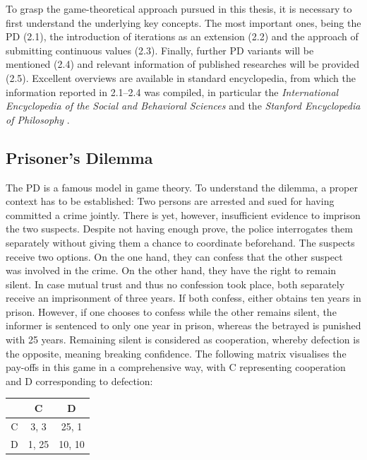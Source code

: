 \documentclass[11pt]{article}
\begin{document}
To grasp the game-theoretical approach pursued in this thesis, it is necessary to first understand the underlying key concepts. 
The most important ones, being the PD (2.1), the introduction of iterations as an extension (2.2) and the approach of submitting continuous values (2.3).
Finally, further PD variants will be mentioned (2.4) and relevant information of published researches will be provided (2.5).
Excellent overviews are available in standard encyclopedia, from which the information reported in 2.1–2.4 was compiled, in particular the \textit{International Encyclopedia of the Social and Behavioral Sciences} \cite{RC15} and the \textit{Stanford Encyclopedia of Philosophy} \cite{Kuh25}.

\subsection{Prisoner's Dilemma}
		
The PD is a famous model in game theory. 
To understand the dilemma, a proper context has to be established:
Two persons are arrested and sued for having committed a crime jointly.
There is yet, however, insufficient evidence to imprison the two suspects.
Despite not having enough prove, the police interrogates them separately without giving them a chance to coordinate beforehand.
The suspects receive two options.
On the one hand, they can confess that the other suspect was involved in the crime. 
On the other hand, they have the right to remain silent.
In case mutual trust and thus no confession took place, both separately receive an imprisonment of three years.
If both confess, either obtains ten years in prison.
However, if one chooses to confess while the other remains silent, the informer is sentenced to only one year in prison, whereas the betrayed is punished with 25 years.
Remaining silent is considered as cooperation, whereby defection is the opposite, meaning breaking confidence. 
The following matrix visualises the pay-offs in this game in a comprehensive way, with C representing cooperation and D corresponding to defection:

\begin{center}
\begin{tabular}{ c|c|c }
   & C & D \\ 
   \hline
 C & 3, 3 & 25, 1\\  
   \hline
 D & 1, 25 & 10, 10
\end{tabular}
\end{center}
\end{document}
